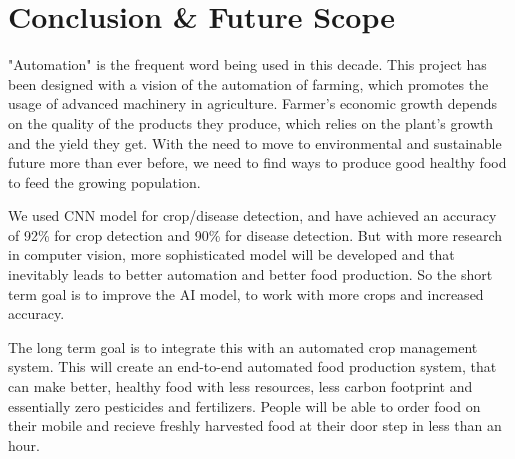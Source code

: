 \documentclass[../Report.tex]{subfiles}
\begin{document}
\chapter{Conclusion \& Future Scope}
"Automation" is the frequent word being used in this decade. This project has been designed with a vision of the automation of farming, 
which promotes the usage of advanced machinery in agriculture. Farmer's economic growth depends on the quality of the products they produce, 
which relies on the plant's growth and the yield they get. With the need to move to environmental and sustainable future more than ever 
before, we need to find ways to produce good healthy food to feed the growing population. \par

We used CNN model for crop/disease detection, and have achieved an accuracy of 92\% for crop detection and 90\% for disease detection. But 
with more research in computer vision, more sophisticated model will be developed and that inevitably leads to better automation and better
food production. So the short term goal is to improve the AI model, to work with more crops and increased accuracy. \par

The long term goal is to integrate this with an automated crop management system. This will create an end-to-end automated food production
system, that can make better, healthy food with less resources, less carbon footprint and essentially zero pesticides and fertilizers. 
People will be able to order food on their mobile and recieve freshly harvested food at their door step in less than an hour.
\end{document}
